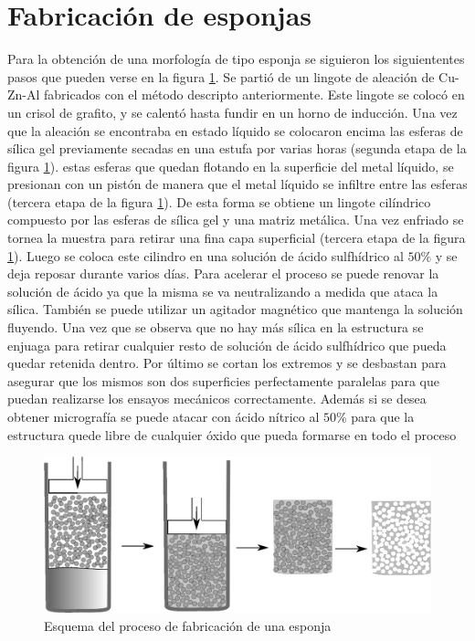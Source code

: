 \documentclass[a4paper,12pt,fleqn,twoside,openany]{book}
\begin{document}
\section{Fabricación de esponjas}

Para la obtención de una morfología de tipo esponja se siguieron los siguiententes pasos que pueden verse en la figura \ref{fig:proceso}. Se partió de un 
lingote de aleación de Cu-Zn-Al fabricados con el método 
descripto anteriormente. Este lingote se colocó en un crisol de grafito, y se calentó hasta fundir en un horno de inducción. Una vez que la aleación se 
encontraba en estado líquido se colocaron encima las esferas de sílica gel previamente secadas en una estufa por varias horas (segunda etapa de la figura 
\ref{fig:proceso}). estas esferas que quedan
flotando en la superficie del metal líquido, se presionan con un pistón de manera que el metal líquido se infiltre entre las esferas (tercera etapa de la 
figura \ref{fig:proceso}). De esta forma se obtiene 
un lingote cilíndrico compuesto por las esferas de sílica gel y una matriz metálica. 
Una vez enfriado se tornea la muestra para retirar una fina capa superficial (tercera etapa de la figura \ref{fig:proceso}). Luego se coloca este cilindro 
en una solución de ácido sulfhídrico al $50\%$
y se deja reposar durante varios días. Para acelerar el proceso se puede renovar la solución de ácido ya que la misma se va neutralizando a medida que 
ataca la sílica. También se puede utilizar un agitador magnético que mantenga la solución fluyendo. Una vez que se observa que no hay más sílica en la 
estructura se enjuaga para retirar cualquier resto de solución de ácido sulfhídrico que pueda quedar retenida dentro. 
Por último se cortan los extremos y se desbastan para asegurar que los mismos son dos superficies perfectamente paralelas para que puedan realizarse los
ensayos mecánicos correctamente. Además si se desea obtener micrografía se puede atacar con ácido nítrico al $50\%$ para que la estructura quede libre de 
cualquier óxido que pueda formarse en todo el proceso


\begin{figure}[h]
 \centering
 \includegraphics[width=1\textwidth]{proceso.eps}
 \caption{Esquema del proceso de fabricación de una esponja} 
 \label{fig:proceso}
 \end{figure}
\end{document}
